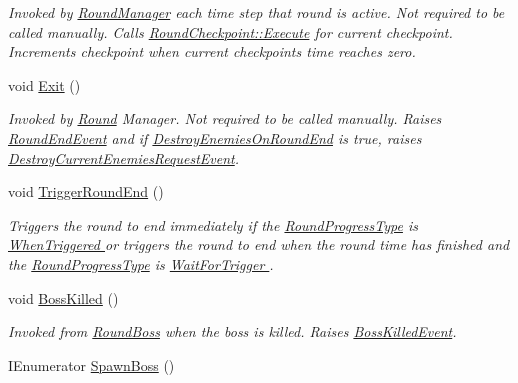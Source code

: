 \begin{DoxyCompactItemize}
\begin{DoxyCompactList}\small\item\em Invoked by \hyperlink{class_round_manager_1_1_round_manager}{Round\+Manager} each time step that round is active. Not required to be called manually. Calls \hyperlink{class_round_manager_1_1_round_checkpoint_a126566a3a5d6e8c0a23f226cfdf05ada}{Round\+Checkpoint\+::\+Execute} for current checkpoint. Increments checkpoint when current checkpoints time reaches zero. \end{DoxyCompactList}\item 
void \hyperlink{class_round_manager_1_1_round_a2f7520d98737224fd63c0c068fdf9c50}{Exit} ()
\begin{DoxyCompactList}\small\item\em Invoked by \hyperlink{class_round_manager_1_1_round}{Round} Manager. Not required to be called manually. Raises \hyperlink{class_round_manager_1_1_events_1_1_round_end_event}{Round\+End\+Event} and if \hyperlink{class_round_manager_1_1_round_a29453a323d20cb447104b57007feba6b}{Destroy\+Enemies\+On\+Round\+End} is true, raises \hyperlink{class_round_manager_1_1_events_1_1_destroy_current_enemies_request_event}{Destroy\+Current\+Enemies\+Request\+Event}. \end{DoxyCompactList}\item 
void \hyperlink{class_round_manager_1_1_round_a920b20ddeb67d8ab4dc68ae956db459f}{Trigger\+Round\+End} ()
\begin{DoxyCompactList}\small\item\em Triggers the round to end immediately if the \hyperlink{class_round_manager_1_1_round_aabbe6a40e81051469e5ca8eefd18303f}{Round\+Progress\+Type} is \hyperlink{}{When\+Triggered } or triggers the round to end when the round time has finished and the \hyperlink{class_round_manager_1_1_round_aabbe6a40e81051469e5ca8eefd18303f}{Round\+Progress\+Type} is \hyperlink{}{Wait\+For\+Trigger }. \end{DoxyCompactList}\item 
void \hyperlink{class_round_manager_1_1_round_a8b60989ebf80e7497984efb956ef9a14}{Boss\+Killed} ()
\begin{DoxyCompactList}\small\item\em Invoked from \hyperlink{class_round_manager_1_1_round_boss}{Round\+Boss} when the boss is killed. Raises \hyperlink{class_round_manager_1_1_events_1_1_boss_killed_event}{Boss\+Killed\+Event}. \end{DoxyCompactList}\item 
I\+Enumerator \hyperlink{class_round_manager_1_1_round_a3576cddec4411c8a5396861e96c82008}{Spawn\+Boss} ()

\end{DoxyCompactItemize}
